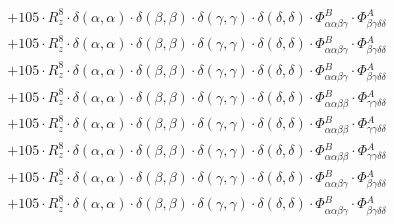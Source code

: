 \documentclass{article}
\begin{document}
\begin{subequations}
\begin{gather}
\begin{array}{c}
 \\[0.2em] 		 + 105 \cdot R_{z}^{8} \cdot \delta{}\left(\alpha{}, \alpha{}\right) \cdot \delta{}\left(\beta{}, \beta{}\right) \cdot \delta{}\left(\gamma{}, \gamma{}\right) \cdot \delta{}\left(\delta{}, \delta{}\right) \cdot \Phi{}^{B}_{\alpha{}\alpha{}\beta{}\gamma{}} \cdot \Phi{}^{A}_{\beta{}\gamma{}\delta{}\delta{}} 
 \\[0.2em] 		 + 105 \cdot R_{z}^{8} \cdot \delta{}\left(\alpha{}, \alpha{}\right) \cdot \delta{}\left(\beta{}, \beta{}\right) \cdot \delta{}\left(\gamma{}, \gamma{}\right) \cdot \delta{}\left(\delta{}, \delta{}\right) \cdot \Phi{}^{B}_{\alpha{}\alpha{}\beta{}\gamma{}} \cdot \Phi{}^{A}_{\beta{}\gamma{}\delta{}\delta{}} 
 \\[0.2em] 		 + 105 \cdot R_{z}^{8} \cdot \delta{}\left(\alpha{}, \alpha{}\right) \cdot \delta{}\left(\beta{}, \beta{}\right) \cdot \delta{}\left(\gamma{}, \gamma{}\right) \cdot \delta{}\left(\delta{}, \delta{}\right) \cdot \Phi{}^{B}_{\alpha{}\alpha{}\beta{}\gamma{}} \cdot \Phi{}^{A}_{\beta{}\gamma{}\delta{}\delta{}} 
 \\[0.2em] 		 + 105 \cdot R_{z}^{8} \cdot \delta{}\left(\alpha{}, \alpha{}\right) \cdot \delta{}\left(\beta{}, \beta{}\right) \cdot \delta{}\left(\gamma{}, \gamma{}\right) \cdot \delta{}\left(\delta{}, \delta{}\right) \cdot \Phi{}^{B}_{\alpha{}\alpha{}\beta{}\beta{}} \cdot \Phi{}^{A}_{\gamma{}\gamma{}\delta{}\delta{}} 
 \\[0.2em] 		 + 105 \cdot R_{z}^{8} \cdot \delta{}\left(\alpha{}, \alpha{}\right) \cdot \delta{}\left(\beta{}, \beta{}\right) \cdot \delta{}\left(\gamma{}, \gamma{}\right) \cdot \delta{}\left(\delta{}, \delta{}\right) \cdot \Phi{}^{B}_{\alpha{}\alpha{}\beta{}\beta{}} \cdot \Phi{}^{A}_{\gamma{}\gamma{}\delta{}\delta{}} 
 \\[0.2em] 		 + 105 \cdot R_{z}^{8} \cdot \delta{}\left(\alpha{}, \alpha{}\right) \cdot \delta{}\left(\beta{}, \beta{}\right) \cdot \delta{}\left(\gamma{}, \gamma{}\right) \cdot \delta{}\left(\delta{}, \delta{}\right) \cdot \Phi{}^{B}_{\alpha{}\alpha{}\beta{}\beta{}} \cdot \Phi{}^{A}_{\gamma{}\gamma{}\delta{}\delta{}} 
 \\[0.2em] 		 + 105 \cdot R_{z}^{8} \cdot \delta{}\left(\alpha{}, \alpha{}\right) \cdot \delta{}\left(\beta{}, \beta{}\right) \cdot \delta{}\left(\gamma{}, \gamma{}\right) \cdot \delta{}\left(\delta{}, \delta{}\right) \cdot \Phi{}^{B}_{\alpha{}\alpha{}\beta{}\gamma{}} \cdot \Phi{}^{A}_{\beta{}\gamma{}\delta{}\delta{}} 
 \\[0.2em] 		 + 105 \cdot R_{z}^{8} \cdot \delta{}\left(\alpha{}, \alpha{}\right) \cdot \delta{}\left(\beta{}, \beta{}\right) \cdot \delta{}\left(\gamma{}, \gamma{}\right) \cdot \delta{}\left(\delta{}, \delta{}\right) \cdot \Phi{}^{B}_{\alpha{}\alpha{}\beta{}\gamma{}} \cdot \Phi{}^{A}_{\beta{}\gamma{}\delta{}\delta{}} 

\end{array}
\end{gather}
\end{subequations}
\end{document}
